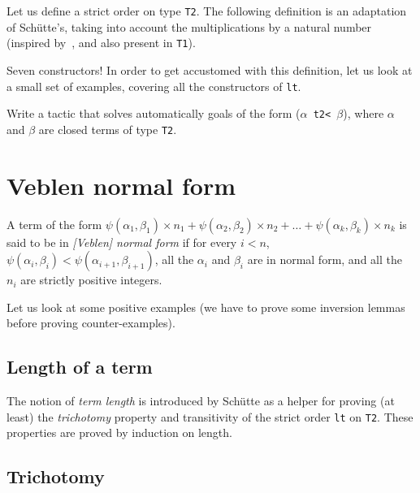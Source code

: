 {Let us define a strict order on type \texttt{T2}. The following definition is 
an adaptation of Schütte's, taking into account the multiplications by a natural number (inspired by~\cite{Manolios2005}, and also present in \texttt{T1}).

\label{sect:t2-lt-def}




Seven constructors! In order to get accustomed with this definition, let us look at a small set of examples, covering all the constructors of \texttt{lt}.





\begin{project}
Write a tactic that solves automatically goals of the form (\texttt{$\alpha$ t2< $\beta$}), where $\alpha$ and $\beta$ are closed terms of type \texttt{T2}.
\end{project}

\section{Veblen normal form}
\begin{definition}
  A term of the form $\psi(\alpha_1,\beta_1)\times n_1+ \psi(\alpha_2,\beta_2)\times n_2+\dots+\psi(\alpha_k,\beta_k)\times n_k$ is said to be in
 \emph{[Veblen] normal form} if for every $i<n$, $\psi(\alpha_i,\beta_i)<\psi(\alpha_{i+1},\beta_{i+1})$, all the $\alpha_i$ and $\beta_i$ are in normal form, and all the $n_i$ are strictly positive integers.
\end{definition}





Let us look at some positive examples (we have to prove some inversion lemmas before proving counter-examples).




\subsection{Length of a term}

The notion of \emph{term length} is introduced by Schütte as a helper for proving (at least) the \emph{trichotomy} property and transitivity of the strict order \texttt{lt} on \texttt{T2}. These properties are proved by induction on length.


\subsection{Trichotomy}

}
